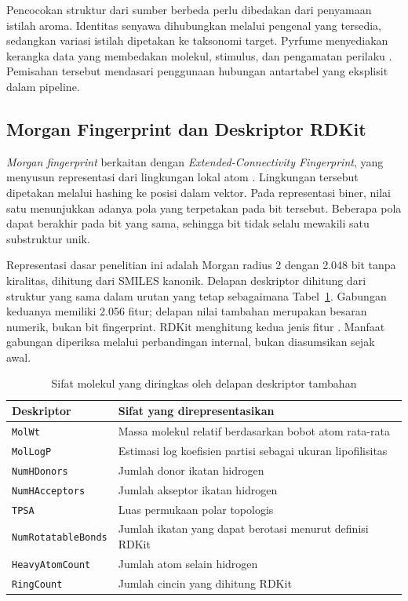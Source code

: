 Pencocokan struktur dari sumber berbeda perlu dibedakan dari penyamaan istilah aroma. Identitas senyawa dihubungkan melalui pengenal yang tersedia, sedangkan variasi istilah dipetakan ke taksonomi target. Pyrfume menyediakan kerangka data yang membedakan molekul, stimulus, dan pengamatan perilaku \cite{hamel2024}. Pemisahan tersebut mendasari penggunaan hubungan antartabel yang eksplisit dalam pipeline.

\subsection{Morgan Fingerprint dan Deskriptor RDKit}

\textit{Morgan fingerprint} berkaitan dengan \textit{Extended-Connectivity Fingerprint}, yang menyusun representasi dari lingkungan lokal atom \cite{rogers2010}. Lingkungan tersebut dipetakan melalui hashing ke posisi dalam vektor. Pada representasi biner, nilai satu menunjukkan adanya pola yang terpetakan pada bit tersebut. Beberapa pola dapat berakhir pada bit yang sama, sehingga bit tidak selalu mewakili satu substruktur unik.

Representasi dasar penelitian ini adalah Morgan radius 2 dengan 2.048 bit tanpa kiralitas, dihitung dari SMILES kanonik. Delapan deskriptor dihitung dari struktur yang sama dalam urutan yang tetap sebagaimana Tabel~\ref{tab:makna_deskriptor}. Gabungan keduanya memiliki 2.056 fitur; delapan nilai tambahan merupakan besaran numerik, bukan bit fingerprint. RDKit menghitung kedua jenis fitur \cite{rdkitgenerator2026,rdkitdescriptors2026}. Manfaat gabungan diperiksa melalui perbandingan internal, bukan diasumsikan sejak awal.

\begin{table}[htbp]
\centering
\caption{Sifat molekul yang diringkas oleh delapan deskriptor tambahan}
\label{tab:makna_deskriptor}
\small
\begin{tabular}{>{\raggedright\arraybackslash}p{}>{\raggedright\arraybackslash}p{}}
\toprule
Deskriptor & Sifat yang direpresentasikan \\
\midrule
\texttt{MolWt} & Massa molekul relatif berdasarkan bobot atom rata-rata \\
\texttt{MolLogP} & Estimasi log koefisien partisi sebagai ukuran lipofilisitas \\
\texttt{NumHDonors} & Jumlah donor ikatan hidrogen \\
\texttt{NumHAcceptors} & Jumlah akseptor ikatan hidrogen \\
\texttt{TPSA} & Luas permukaan polar topologis \\
\texttt{NumRotatableBonds} & Jumlah ikatan yang dapat berotasi menurut definisi RDKit \\
\texttt{HeavyAtomCount} & Jumlah atom selain hidrogen \\
\texttt{RingCount} & Jumlah cincin yang dihitung RDKit \\
\bottomrule
\end{tabular}
\end{table}

